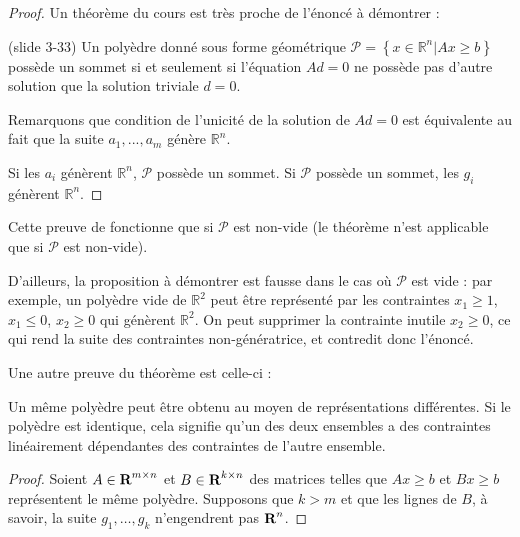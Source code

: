 \begin{enumerate}
    \begin{solution}
        \begin{proof}
        Un théorème du cours est très proche de l'énoncé à démontrer :

        \begin{theorem}{(slide 3-33)}
            Un polyèdre donné sous forme géométrique
            $\mathcal{P} = \left\{ x\in \mathbb{R}^n | Ax \geq b\right\}$
            possède un sommet si et seulement si l'équation $Ad=0$ ne
            possède pas d'autre solution que la solution triviale $d=0$.
        \end{theorem}

        Remarquons que condition de l'unicité de la solution de $Ad=0$ est équivalente
        au fait que la suite $a_1, ..., a_m$ génère $\mathbb{R}^n$.

        Si les $a_i$ génèrent $\mathbb{R}^n$, $\mathcal{P}$ possède un sommet.
        Si $\mathcal{P}$ possède un sommet, les $g_i$ génèrent $\mathbb{R}^n$.
        \end{proof}

        Cette preuve de fonctionne que si $\mathcal{P}$ est non-vide (le théorème
        n'est applicable que si $\mathcal{P}$ est non-vide).

        D'ailleurs, la proposition à démontrer est fausse dans le cas où $\mathcal{P}$
        est vide : par exemple, un polyèdre vide de $\mathbb{R}^2$ peut être
        représenté par les contraintes $x_1 \geq 1$, $x_1 \leq 0$, $x_2 \geq 0$
        qui génèrent $\mathbb{R}^2$. On peut supprimer la contrainte \og{}inutile\fg{}
        $x_2 \geq 0$, ce qui rend la suite des contraintes non-génératrice, et
        contredit donc l'énoncé.

        Une autre preuve du théorème est celle-ci :

      Un même polyèdre peut être obtenu au moyen de
      représentations différentes.
      Si le polyèdre est identique,
      cela signifie qu'un des deux ensembles a des contraintes linéairement
      dépendantes des contraintes de l'autre ensemble.
      \begin{proof}

        Soient $A \in {\mbox{\bf R}}^{m \times n} $ et $B \in {\mbox{\bf R}}^{k \times n} $ des matrices
        telles que $Ax \geq b$ et $Bx \geq b$ représentent le même polyèdre.
        Supposons que $ k > m$ et que les lignes de $B$, à savoir,
        la suite $g_{1}, \dots, g_{k}$ n'engendrent pas ${\mbox{\bf R}}^{n}$.


\end{proof}
\end{solution}
\end{enumerate}
